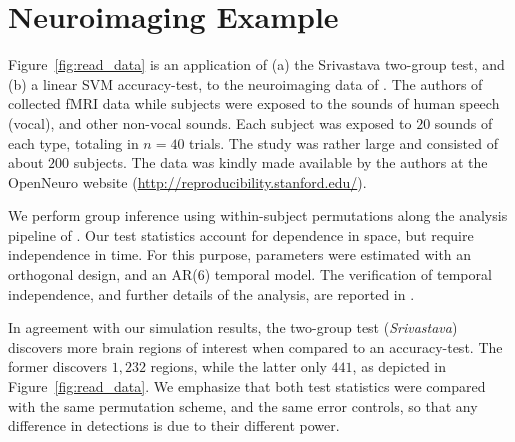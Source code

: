\documentclass[]{bio}
\begin{document}
\section{Neuroimaging Example}
\label{sec:example}

Figure~\ref{fig:read_data} is an application of (a) the Srivastava two-group test, and (b) a linear SVM accuracy-test, to the neuroimaging data of \citet{pernet_human_2015}. 
The authors of \cite{pernet_human_2015} collected fMRI data while subjects were exposed to the sounds of human speech (vocal), and other non-vocal sounds. 
Each subject was exposed to $20$ sounds of each type, totaling in $n=40$ trials.
The study was rather large and consisted of about $200$ subjects.
The data was kindly made available by the authors at the OpenNeuro website (\url{http://reproducibility.stanford.edu/}).

We perform group inference using within-subject permutations along the analysis pipeline of \cite{stelzer_statistical_2013}. 
Our test statistics account for dependence in space, but require independence in time. 
For this purpose, parameters were estimated with an orthogonal design, and an AR(6) temporal model.
The verification of temporal independence, and further details of the analysis, are reported in \cite{gilron_quantifying_2016}. 

In agreement with our simulation results, the two-group test (\emph{Srivastava}) discovers more brain regions of interest when compared to an accuracy-test.
The former discovers $1,232$ regions, while the latter only $441$, as depicted in Figure~\ref{fig:read_data}.
We emphasize that both test statistics were compared with the same permutation scheme, and the same error controls, so that any difference in detections is due to their different power.
\end{document}
